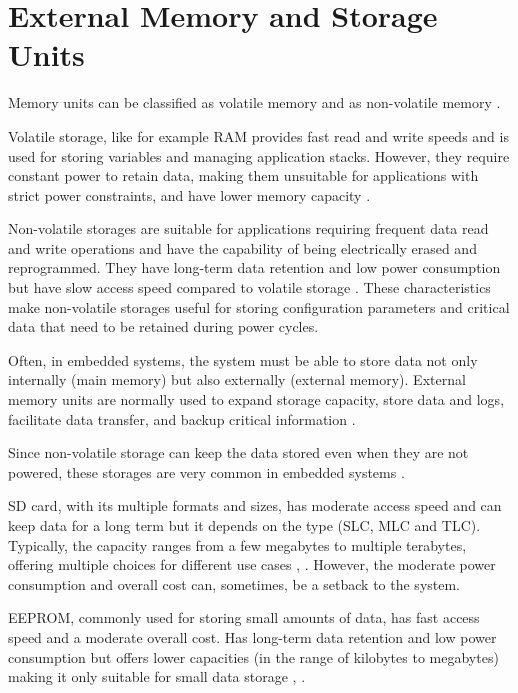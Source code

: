 \section{External Memory and Storage Units}

Memory units can be classified as volatile memory and as non-volatile memory \cite{mem3}.

Volatile storage, like for example \gls{RAM} provides fast read and write speeds and is used for storing variables and managing application stacks.
However, they require constant power to retain data, making them unsuitable for applications with strict power constraints, and have lower memory capacity \cite{mem8}.

Non-volatile storages are suitable for applications requiring frequent data read and write operations and have the capability of being electrically erased and reprogrammed.
They have long-term data retention and low power consumption but have slow access speed compared to volatile storage \cite{mem8}.
These characteristics make non-volatile storages useful for storing configuration parameters and critical data that need to be retained during power cycles.

Often, in embedded systems, the system must be able to store data not only internally (main memory) but also externally (external memory).
External memory units are normally used to expand storage capacity, store data and logs, facilitate data transfer, and backup critical information \cite{mem3}.

Since non-volatile storage can keep the data stored even when they are not powered, these storages are very common in embedded systems \cite{mem1}.

\gls{SD} card, with its multiple formats and sizes, has moderate access speed and can keep data for a long term but it depends on the type (\gls{SLC}, \gls{MLC} and \gls{TLC}).
Typically, the capacity ranges from a few megabytes to multiple terabytes, offering multiple choices for different use cases \cite{mem11}, \cite{mem9}.
However, the moderate power consumption and overall cost can, sometimes, be a setback to the system.

\gls{EEPROM}, commonly used for storing small amounts of data, has fast access speed and a moderate overall cost.
Has long-term data retention and low power consumption but offers lower capacities (in the range of kilobytes to megabytes) making it only suitable for small data storage \cite{mem8}, \cite{mem11}.

